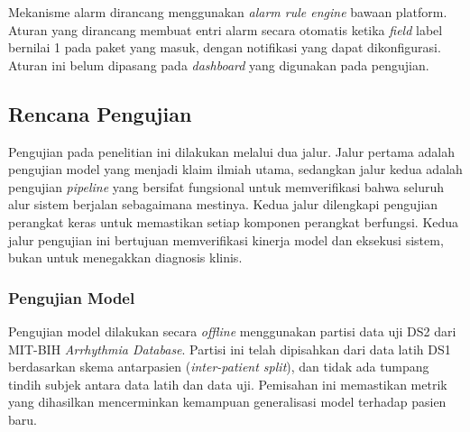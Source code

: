 Mekanisme alarm dirancang menggunakan \textit{alarm rule engine} bawaan
platform. Aturan yang dirancang membuat entri alarm secara otomatis ketika
\textit{field} label bernilai 1 pada paket yang masuk, dengan notifikasi yang
dapat dikonfigurasi. Aturan ini belum dipasang pada \textit{dashboard} yang
digunakan pada pengujian.



\subsection{Rencana Pengujian}

Pengujian pada penelitian ini dilakukan melalui dua jalur. Jalur pertama adalah pengujian model yang menjadi klaim ilmiah utama, sedangkan jalur kedua adalah pengujian \textit{pipeline} yang bersifat fungsional untuk memverifikasi bahwa seluruh alur sistem berjalan sebagaimana mestinya. Kedua jalur dilengkapi pengujian perangkat keras untuk memastikan setiap komponen perangkat berfungsi. Kedua jalur pengujian ini bertujuan memverifikasi kinerja model dan eksekusi sistem, bukan untuk menegakkan diagnosis klinis.

\subsubsection{Pengujian Model}

Pengujian model dilakukan secara \textit{offline} menggunakan partisi data uji DS2 dari MIT-BIH \textit{Arrhythmia Database}. Partisi ini telah dipisahkan dari data latih DS1 berdasarkan skema antarpasien (\textit{inter-patient split}), dan tidak ada tumpang tindih subjek antara data latih dan data uji. Pemisahan ini memastikan metrik yang dihasilkan mencerminkan kemampuan generalisasi model terhadap pasien baru.

